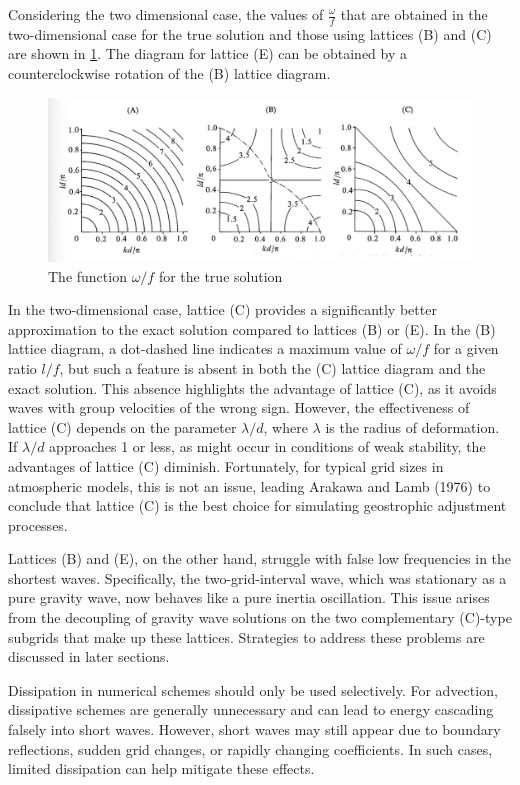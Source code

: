 Considering the two dimensional case, the values of $\frac{\omega}{f}$ that are obtained in the two-dimensional case for the true solution and those using lattices (B) and (C) are shown in \ref{fig:5.3.3}. The diagram for lattice (E) can be obtained by a counterclockwise rotation of the (B) lattice diagram.
\begin{figure}[h]
    \centering
    \includegraphics[width=0.5\linewidth]{uploads/Screenshot 2024-11-14 124824.png}
    \caption{The function $\omega/f$ for the true solution}
    \label{fig:5.3.3}
\end{figure}
In the two-dimensional case, lattice (C) provides a significantly better approximation to the exact solution compared to lattices (B) or (E). In the (B) lattice diagram, a dot-dashed line indicates a maximum value of $\omega / f$ for a given ratio $l/f$, but such a feature is absent in both the (C) lattice diagram and the exact solution. This absence highlights the advantage of lattice (C), as it avoids waves with group velocities of the wrong sign. However, the effectiveness of lattice (C) depends on the parameter $\lambda /d$, where $\lambda$ is the radius of deformation. If $\lambda /d$ approaches 1 or less, as might occur in conditions of weak stability, the advantages of lattice (C) diminish. Fortunately, for typical grid sizes in atmospheric models, this is not an issue, leading Arakawa and Lamb (1976) to conclude that lattice (C) is the best choice for simulating geostrophic adjustment processes.

Lattices (B) and (E), on the other hand, struggle with false low frequencies in the shortest waves. Specifically, the two-grid-interval wave, which was stationary as a pure gravity wave, now behaves like a pure inertia oscillation. This issue arises from the decoupling of gravity wave solutions on the two complementary (C)-type subgrids that make up these lattices. Strategies to address these problems are discussed in later sections.

 
Dissipation in numerical schemes should only be used selectively. For advection, dissipative schemes are generally unnecessary and can lead to energy cascading falsely into short waves. However, short waves may still appear due to boundary reflections, sudden grid changes, or rapidly changing coefficients. In such cases, limited dissipation can help mitigate these effects.

